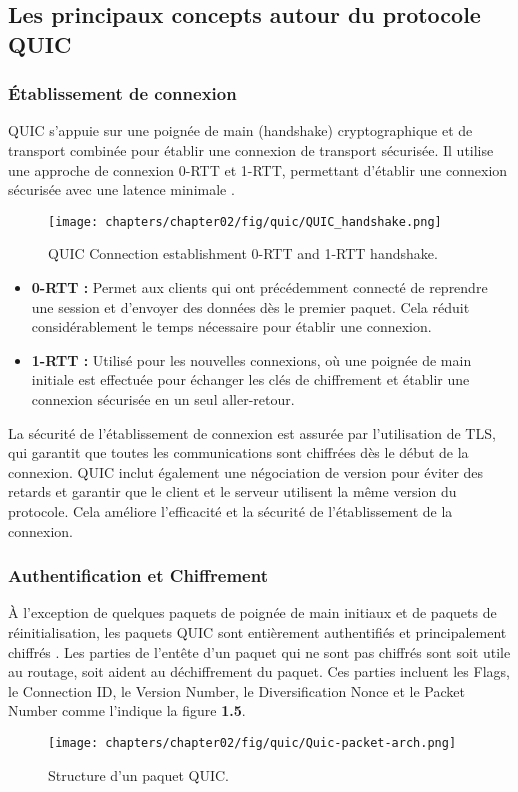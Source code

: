 \subsection{Les principaux concepts autour du protocole QUIC}
\subsubsection{Établissement de connexion }
QUIC s'appuie sur une poignée de main (handshake) cryptographique et de transport combinée pour établir une connexion de transport sécurisée. Il utilise une approche de connexion 0-RTT et 1-RTT, permettant d'établir une connexion sécurisée avec une latence minimale \cite{alawaji2021ietf, langley2017quic}.

\begin{figure}[H]
    \centering
    \texttt{[image: chapters/chapter02/fig/quic/QUIC\_handshake.png]}
    \caption{QUIC Connection establishment 0-RTT and 1-RTT handshake.\cite{alawaji2021ietf}}
    \label{fig:gen}
\end{figure}

\begin{itemize}
    \item \textbf{0-RTT :} Permet aux clients qui ont précédemment connecté de reprendre une session et d'envoyer des données dès le premier paquet. Cela réduit considérablement le temps nécessaire pour établir une connexion.
    \item \textbf{1-RTT :} Utilisé pour les nouvelles connexions, où une poignée de main initiale est effectuée pour échanger les clés de chiffrement et établir une connexion sécurisée en un seul aller-retour.
\end{itemize}

La sécurité de l'établissement de connexion est assurée par l'utilisation de TLS, qui garantit que toutes les communications sont chiffrées dès le début de la connexion. QUIC inclut également une négociation de version pour éviter des retards et garantir que le client et le serveur utilisent la même version du protocole. Cela améliore l'efficacité et la sécurité de l'établissement de la connexion.

\subsubsection{Authentification et Chiffrement}
À l'exception de quelques paquets de poignée de main initiaux et de paquets de réinitialisation, les paquets QUIC sont entièrement authentifiés et principalement chiffrés \cite{langley2017quic}.
Les parties de l'entête d'un paquet qui ne sont pas chiffrés sont soit utile au routage, soit aident au déchiffrement du paquet. Ces parties incluent les Flags, le Connection ID, le Version Number, le Diversification Nonce et le Packet Number comme l'indique la figure \textbf{1.5}.
\begin{figure}[H]
    \centering
    \texttt{[image: chapters/chapter02/fig/quic/Quic-packet-arch.png]}
    \caption{Structure d'un paquet QUIC.\cite{quicpaquet}}
    \label{fig:gen}
\end{figure}

